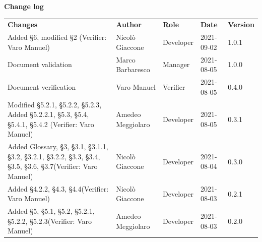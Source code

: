 \documentclass[a4paper]{article}
\begin{document}
\begin{center}
    \textbf{\Large Change log}\\
    \vspace{10px}
    \begin{table}[h!]
        \centering
        \renewcommand{\arraystretch}{1.8}
        \begin{tabular}{p{150px} p{90px} p{80px} p{60px} p{45px}}
            \rowcolor{logo!70} \textbf{Changes}                                                                                                                  & \textbf{Author}   & \textbf{Role} & \textbf{Date} & \textbf{Version} \\
            Added \S{6}, modified \S{2} \newline(Verifier: Varo Manuel)                                                                                          & Nicolò Giaccone   & Developer     & 2021-09-02    & 1.0.1            \\
            Document validation                                                                                                                                  & Marco Barbaresco  & Manager       & 2021-08-05    & 1.0.0            \\
            Document verification                                                                                                                                & Varo Manuel       & Verifier      & 2021-08-05    & 0.4.0            \\
            Modified \S{5.2.1}, \S{5.2.2}, \S{5.2.3}, Added \S{5.2.2.1}, \S{5.3}, \S{5.4}, \S{5.4.1}, \S{5.4.2} \newline(Verifier: Varo Manuel)                  & Amedeo Meggiolaro & Developer     & 2021-08-05    & 0.3.1            \\
            Added Glossary, \S{3}, \S{3.1}, \S{3.1.1}, \S{3.2}, \S{3.2.1}, \S{3.2.2}, \S{3.3}, \S{3.4}, \S{3.5}, \S{3.6}, \S{3.7}\newline(Verifier: Varo Manuel) & Nicolò Giaccone   & Developer     & 2021-08-04    & 0.3.0            \\
            Added \S{4.2.2}, \S{4.3}, \S{4.4}\newline(Verifier: Varo Manuel)                                                                                     & Nicolò Giaccone   & Developer     & 2021-08-03    & 0.2.1            \\
            Added \S{5}, \S{5.1}, \S{5.2}, \S{5.2.1}, \S{5.2.2}, \S{5.2.3}\newline(Verifier: Varo Manuel)                                                        & Amedeo Meggiolaro & Developer     & 2021-08-03    & 0.2.0            \\

\end{tabular}
\end{table}
\end{center}
\end{document}
